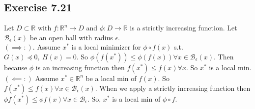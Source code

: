 \documentclass[11.5pt, letterpaper, bibtotoc,
    tablecaptionabove, figurecaptionabove]{article}
\begin{document}
\subsection*{Exercise 7.21}
Let $D \subset \mathbb{R}$ with $f: \mathbb{R}^n \rightarrow D$ and $\phi: D \rightarrow \mathbb{R}$ is a strictly increasing function. Let $\mathcal{B}_{\epsilon}(x)$ be an open ball with radius $\epsilon$.\\
$(\implies :)$. Assume $x^*$ is a local minimizer for $\phi \circ f(x)$ s.t. $ G(x) \preceq 0, \: H(x) = 0$.  So $\phi(f(x^*)) \leq \phi(f(x)) \forall x \in \mathcal{B}_{\epsilon}(x)$.  Then because $\phi$ is an increasing function then $f(x^*) \leq f(x) \forall x$.  So $x^*$ is a local min.  \\
$(\impliedby :)$ Assume $x^* \in \mathbb{R}^n$ be a local min of $f(x)$.  So $f(x^*) \leq f(x) \forall x \in \mathcal{B}_{\epsilon}(x)$. When we apply a strictly increasing function then $\phi f(x^*) \leq \phi f(x)\forall x \in \mathcal{B}_{\epsilon}$.  So, $x^*$ is a local min of $\phi \circ f$. 
\end{document}
